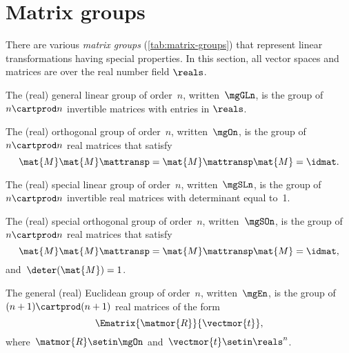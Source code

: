 
\section{Matrix groups}
\label{sec:matrix-grps}


There are various \emph{matrix groups} (\cref{tab:matrix-groups}) that represent linear transformations having special properties. In this section, all vector spaces and matrices are over the real number field $\reals$. 

\begin{definition}
    \label{def:general-linear-group}
    The (real) general linear group of order~$n$, written~$\mgGLn$, is the group of $n\cartprod n$ invertible matrices with entries in $\reals$.
\end{definition}


\begin{definition}
    \label{def:general-orthogonal-group}
    The (real) orthogonal group of order~$n$, written~$\mgOn$, is the group of~$n\cartprod n$  real matrices that satisfy
    \begin{equation}
        \mat{M} \mat{M}\mattransp = \mat{M}\mattransp \mat{M} = \idmat.
    \end{equation}
\end{definition}

\begin{definition}
    \label{def:special-linear-group}
    The (real) special linear group of order~$n$, written~$\mgSLn$, is the group of~$n\cartprod n$ invertible real matrices with determinant equal to~1.
\end{definition}
\begin{definition}
    \label{def:special-orthogonal-group}
    The (real) special orthogonal group of order~$n$, written~$\mgSOn$, is the group of~$n\cartprod n$ real matrices that satisfy
    \begin{equation}
        \mat{M} \mat{M}\mattransp = \mat{M}\mattransp \mat{M} = \idmat,
    \end{equation}
    and~$\deter(\mat{M}) = 1$.
\end{definition}

\begin{definition}
    \label{def:general-euclidean-group}
    The general (real) Euclidean group of order~$n$, written~$\mgEn$, is the group of~$(n+1)\cartprod (n+1)$ real matrices of the form
    \begin{equation}
        \label{eq:En-def}
        \Ematrix{\matmor{R}}{\vectmor{t}},
    \end{equation}
    where~$\matmor{R}\setin \mgOn$ and~$\vectmor{t} \setin \reals^n$.
\end{definition}


